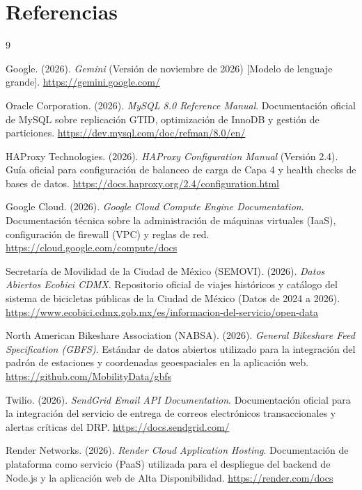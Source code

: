 \documentclass[10pt,a4paper]{article}
\begin{document}
\newpage

\section{Referencias}

\begin{thebibliography}{9}

Google. (2026). \textit{Gemini} (Versión de noviembre de 2026) [Modelo de lenguaje grande]. 
\url{https://gemini.google.com/}

Oracle Corporation. (2026). \textit{MySQL 8.0 Reference Manual}. Documentación oficial de MySQL sobre replicación GTID, optimización de InnoDB y gestión de particiones. \url{https://dev.mysql.com/doc/refman/8.0/en/}

HAProxy Technologies. (2026). \textit{HAProxy Configuration Manual} (Versión 2.4). Guía oficial para configuración de balanceo de carga de Capa 4 y health checks de bases de datos. \url{https://docs.haproxy.org/2.4/configuration.html}

Google Cloud. (2026). \textit{Google Cloud Compute Engine Documentation}. Documentación técnica sobre la administración de máquinas virtuales (IaaS), configuración de firewall (VPC) y reglas de red. \url{https://cloud.google.com/compute/docs}

Secretaría de Movilidad de la Ciudad de México (SEMOVI). (2026). \textit{Datos Abiertos Ecobici CDMX}. Repositorio oficial de viajes históricos y catálogo del sistema de bicicletas públicas de la Ciudad de México (Datos de 2024 a 2026). \url{https://www.ecobici.cdmx.gob.mx/es/informacion-del-servicio/open-data}

North American Bikeshare Association (NABSA). (2026). \textit{General Bikeshare Feed Specification (GBFS)}. Estándar de datos abiertos utilizado para la integración del padrón de estaciones y coordenadas geoespaciales en la aplicación web. \url{https://github.com/MobilityData/gbfs}

Twilio. (2026). \textit{SendGrid Email API Documentation}. Documentación oficial para la integración del servicio de entrega de correos electrónicos transaccionales y alertas críticas del DRP. \url{https://docs.sendgrid.com/}

Render Networks. (2026). \textit{Render Cloud Application Hosting}. Documentación de plataforma como servicio (PaaS) utilizada para el despliegue del backend de Node.js y la aplicación web de Alta Disponibilidad. \url{https://render.com/docs}

\end{thebibliography}
\end{document}

